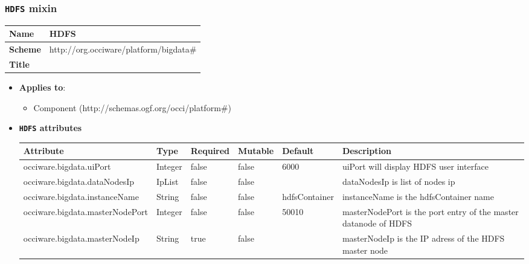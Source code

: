 \subsubsection{\texttt{HDFS} mixin}
\begin{center}
\begin{tabular}{|l|l|}
  \hline
  \textbf{Name} & HDFS \\
  \hline  
  \textbf{Scheme} & http://org.occiware/platform/bigdata\# \\
  \hline
  \textbf{Title} &  \\
  \hline
\end{tabular}
\end{center}
\begin{itemize}
\item \textbf{Applies to}:
\begin{itemize}
	\item Component (http://schemas.ogf.org/occi/platform\#)
\end{itemize}
\end{itemize} 

\begin{itemize}
\item \textbf{\texttt{HDFS} attributes}

\begin{tabularx}{\textwidth}{|l|l|p{1.4cm}|p{1.3cm}|l|X|}
  \hline
  \textbf{Attribute} & \textbf{Type} & \textbf{Required} & \textbf{Mutable} & \textbf{Default} & \textbf{Description} \\
  \hline  
  occiware.bigdata.uiPort & Integer & false & false & 6000 & uiPort will display HDFS user interface \\
  \hline
  occiware.bigdata.dataNodesIp & IpList & false & false &  & dataNodesIp is list of nodes ip \\
  \hline
  occiware.bigdata.instanceName & String & false & false & hdfsContainer & instanceName is the hdfsContainer name \\
  \hline
  occiware.bigdata.masterNodePort & Integer & false & false & 50010 & masterNodePort is the port entry of the master datanode of HDFS  \\
  \hline
  occiware.bigdata.masterNodeIp & String & true & false &  & masterNodeIp is the IP adress of the HDFS master node \\
  \hline
\end{tabularx}
\end{itemize}


 
